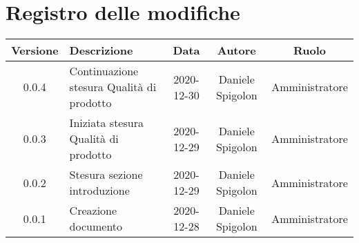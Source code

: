 \section*{Registro delle modifiche}

\begin{center}
	\begin{longtable}{|c|p{5cm}|c|c|c|}
	\hline
	\rowcolor{lighter-grayer}
	\textbf{Versione} & \textbf{Descrizione} & \textbf{Data} & \textbf{Autore} & \textbf{Ruolo} \\
	\hline
	\endfirsthead

	0.0.4 & Continuazione stesura Qualità di prodotto & 2020-12-30 & Daniele Spigolon & Amministratore \\
	\hline
	0.0.3 & Iniziata stesura Qualità di prodotto & 2020-12-29 & Daniele Spigolon & Amministratore \\
	\hline
	0.0.2 & Stesura sezione introduzione & 2020-12-29 & Daniele Spigolon & Amministratore \\
	\hline
	0.0.1 & Creazione documento & 2020-12-28 & Daniele Spigolon & Amministratore \\
	\hline

	\end{longtable}
\end{center}